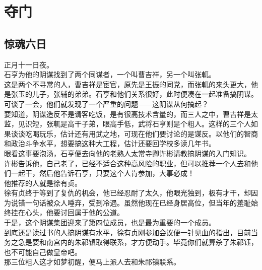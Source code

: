 \section{夺门}
\ifnum{}
	\begin{multicols}{\theparacolNo}
\fi
\subsection{惊魂六日}
正月十一日夜。\\

石亨为他的阴谋找到了两个同谋者，一个叫曹吉祥，另一个叫张軏。\\

这是两个不寻常的人，曹吉祥是宦官，原先是王振的同党，而张軏的来头更大，他是张玉的儿子，张辅的弟弟。石亨和他们关系很好，此时便凑在一起准备搞阴谋。\\

可谈了一会，他们就发现了一个严重的问题——这阴谋从何搞起？\\

要知道，阴谋造反不是请客吃饭，是有很高技术含量的，而三人之中，曹吉祥是太监，见识短，张軏是高干子弟，眼高手低，武将石亨则是个粗人。这样的三个人如果谈谈吃喝玩乐，估计还有用武之地，可现在他们要讨论的是谋反。以他们的智商和政治斗争水平，想要搞这种大工程，估计还要回学校多读几年书。\\

眼看这事要泡汤，石亨便去向他的老熟人太常寺卿许彬请教搞阴谋的入门知识。\\

许彬告诉他，自己老了，已经不适合这种高风险的职业，但可以推荐一个人去和他们一起干，然后他告诉石亨，只要这个人肯参加，大事必成！\\

他推荐的人就是徐有贞。\\

徐有贞终于等到了复仇的机会，他已经忍耐了太久，他眼光独到，极有才干，却因为说错一句话被众人唾弃，受到冷遇。虽然他现在已经身居高位，但当年的羞耻始终挂在心头，他要讨回属于他的公道。\\

于是，这个阴谋集团迎来了第四位成员，也是最为重要的一个成员。\\

到底还是读过书的人搞阴谋有水平，徐有贞刚参加会议便一针见血的指出，目前当务之急是要和南宫内的朱祁镇取得联系，才方便动手。毕竟你们就算杀了朱祁钰，也不可能自己做皇帝吧。\\

那三位粗人这才如梦初醒，便马上派人去和朱祁镇联系。\\


\end{multicols}
